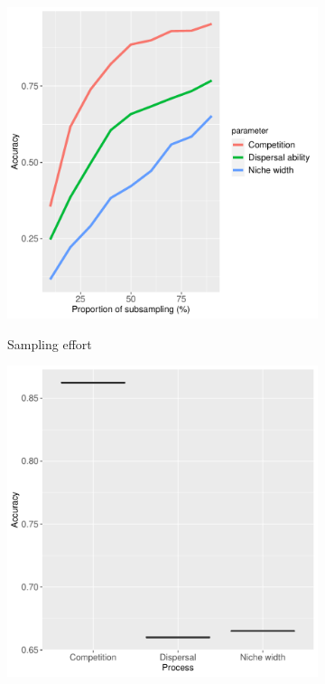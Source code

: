 \begin{figure}
	\centering
	\begin{subfigure}[b]{0.47\textwidth}
		\includegraphics[width=\textwidth]{./figures/Robustness_sampling_effort_Accuracy.pdf}
		\caption{Sampling effort}
		\DIFdelbeginFL %
		\DIFdelendFL \DIFaddbeginFL \label{fig:robust-samp}
		\DIFaddendFL \end{subfigure}
	\begin{subfigure}[b]{0.47\textwidth}
		\includegraphics[width=\textwidth]{./figures/Robustness_time_step_Accuracy_distribution.pdf}

\end{subfigure}
\end{figure}
